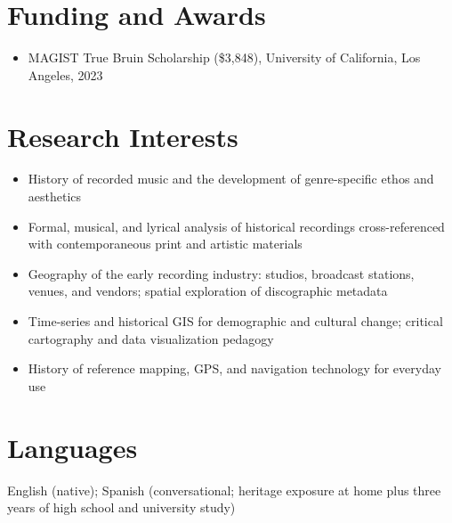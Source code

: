 \documentclass[letterpaper,10pt]{article}
\newlength{\bulletgap}  \setlength{\bulletgap}{0pt}  %
\newlength{\groupindent}\setlength{\groupindent}{0.15in} %
\newcommand{\resumeItem}[1]{\item \small{#1}}
\newif\ifresumecont \resumecontfalse
\newcommand{\resumeItemListStart}{%
  \begin{itemize}[leftmargin=\groupindent, itemsep=\bulletgap,
                  parsep=0pt, topsep=1pt, partopsep=0pt]}
\newcommand{\resumeItemListEnd}{\resumecontfalse\end{itemize}}
\begin{document}
\section{Funding and Awards}
    \resumeItemListStart
      \resumeItem{\small MAGIST True Bruin Scholarship (\$3,848), University of California, Los Angeles, 2023}
    \resumeItemListEnd



\section{Research Interests}
    \resumeItemListStart
      \resumeItem{\small History of recorded music and the development of genre-specific ethos and aesthetics}
      \resumeItem{\small Formal, musical, and lyrical analysis of historical recordings cross-referenced with contemporaneous print and artistic materials}
      \resumeItem{\small Geography of the early recording industry: studios, broadcast stations, venues, and vendors; spatial exploration of discographic metadata}
      \resumeItem{\small Time-series and historical GIS for demographic and cultural change; critical cartography and data visualization pedagogy}
      \resumeItem{\small History of reference mapping, GPS, and navigation technology for everyday use}
    \resumeItemListEnd



\section{Languages}
 \begin{itemize}[leftmargin=0.15in, label={}]
    \small{\item{
     English (native); Spanish (conversational; heritage exposure at home plus three years of high school and university study)
    }}
 \end{itemize}


\end{document}
